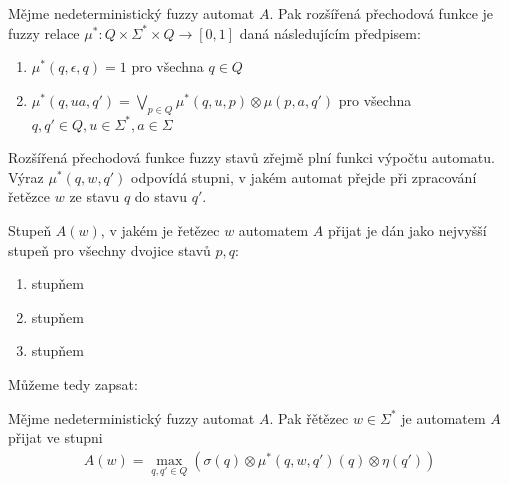 \documentclass[a4paper,10pt]{article}
\begin{document}
\begin{definition}\label{def-RozPreFunFuzzStav}
 Mějme nedeterministický fuzzy automat $A$. Pak rozšířená přechodová funkce je fuzzy relace $\mu^*: Q \times \Sigma^* \times Q \rightarrow [0,1]$ daná následujícím předpisem:
 
 \begin{enumerate}
  \item $\mu^*(q, \epsilon, q) = 1$ pro všechna $q \in Q$
  \item $\mu^*(q, u a, q') =  \bigvee_{p \in Q} \mu^*(q, u, p) \otimes \mu(p, a, q')$ pro všechna $q, q' \in Q, u \in \Sigma^*, a \in \Sigma$
 \end{enumerate}
\end{definition}

Rozšířená přechodová funkce fuzzy stavů zřejmě plní funkci výpočtu automatu. Výraz $\mu^*(q, w, q')$ odpovídá stupni, v jakém automat přejde při zpracování řetězce $w$ ze stavu $q$ do stavu $q'$. 

Stupeň $A(w)$, v jakém je řetězec $w$ automatem $A$ přijat je dán jako nejvyšší stupeň pro všechny dvojice stavů $p, q$:
\begin{enumerate}
 \item stupňem 
 \item stupňem 
 \item stupňem 
\end{enumerate}

Můžeme tedy zapsat:

\begin{definition}\label{def-RetPriAut}
 Mějme nedeterministický fuzzy automat $A$. Pak řětězec $w \in \Sigma^*$ je automatem $A$ přijat ve stupni
 \begin{align} \label{eq-RetPriAut}
  A(w) = \max_{q, q' \in Q} (\sigma(q) \otimes \mu^*(q, w, q')(q) \otimes \eta(q'))
 \end{align}
\end{definition}
\end{document}
